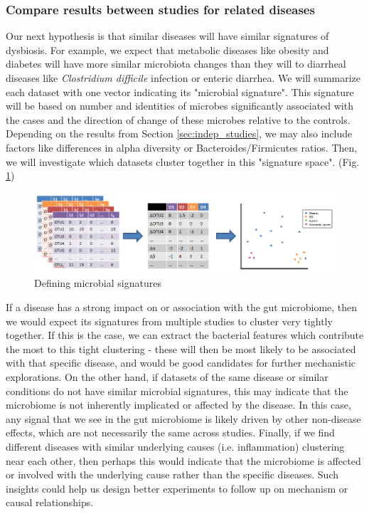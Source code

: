 \documentclass[12pt]{article}
\begin{document}
\subsubsection{Compare results between studies for related diseases}\label{sec:signatures}
Our next hypothesis is that similar diseases will have similar 
signatures of dysbiosis. For example, we expect that metabolic 
diseases like obesity and diabetes will have more similar microbiota 
changes than they will to diarrheal diseases like \textit{Clostridium 
difficile} infection or enteric diarrhea. We will summarize each 
dataset with one vector indicating its "microbial signature". This 
signature will be based on number and identities of microbes 
significantly associated with the cases and the direction of change 
of these microbes relative to the controls. Depending on the results from Section 
\ref{sec:indep_studies}, we may also include factors like differences 
in alpha diversity or Bacteroides/Firmicutes ratios. Then, we will 
investigate which datasets cluster together in this "signature space". 
(Fig. \ref{fig:microbe_signatures})

\begin{figure}
\begin{center}
\includegraphics[scale=0.5]{microbial_signatures}
\caption{Defining microbial signatures}\label{fig:microbe_signatures}
\end{center}
\end{figure}


If a disease has a strong impact on or association with the gut 
microbiome, then we would expect its signatures from multiple studies 
to cluster very tightly together. If this is the case, we can extract 
the bacterial features which contribute the most to this tight 
clustering - these will then be most likely to be associated with that 
specific disease, and would be good candidates for further mechanistic 
explorations. On the other hand, if datasets of the same disease or 
similar conditions do not have similar microbial signatures, this may 
indicate that the microbiome is not inherently implicated or affected 
by the disease. In this case, any signal that we see in the gut 
microbiome is likely driven by other non-disease effects, which are 
not necessarily the same across studies. Finally, if we find different 
diseases with similar underlying causes (i.e. inflammation) clustering 
near each other, then perhaps this would indicate that the microbiome 
is affected or involved with the underlying cause rather than the 
specific diseases. Such insights could help us design better 
experiments to follow up on mechanism or causal relationships.
\end{document}
